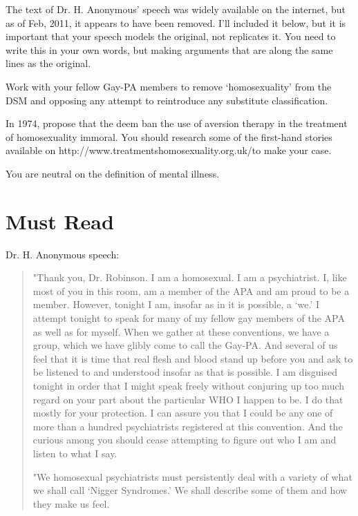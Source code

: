 \begin{refsection}
The text of Dr. H. Anonymous' speech was widely available on the internet, but as of Feb, 2011, it appears to have been removed. I'll included it below, but it is important that your speech models the original, not replicates it. You need to write this in your own words, but making arguments that are along the same lines as the original.

Work with your fellow Gay-PA members to remove `homosexuality' from the DSM and opposing any attempt to reintroduce any substitute classification.

In 1974, propose that the deem ban the use of aversion therapy in the treatment of homosexuality immoral. You should research some of the first-hand stories available on http:\slash \slash www.treatmentshomosexuality.org.uk\slash  to make your case.

You are neutral on the definition of mental illness. 

\section{Must Read}
\label{mustread}

Dr. H. Anonymous speech:

\begin{quote}

"Thank you, Dr. Robinson. I am a homosexual. I am a psychiatrist. I, like most of you in this room, am a member of the APA and am proud to be a member. However, tonight I am, insofar as in it is possible, a `we.' I attempt tonight to speak for many of my fellow gay members of the APA as well as for myself. When we gather at these conventions, we have a group, which we have glibly come to call the Gay-PA. And several of us feel that it is time that real flesh and blood stand up before you and ask to be listened to and understood insofar as that is possible. I am disguised tonight in order that I might speak freely without conjuring up too much regard on your part about the particular WHO I happen to be. I do that mostly for your protection. I can assure you that I could be any one of more than a hundred psychiatrists registered at this convention. And the curious among you should cease attempting to figure out who I am and listen to what I say.

"We homosexual psychiatrists must persistently deal with a variety of what we shall call `Nigger Syndromes.' We shall describe some of them and how they make us feel.


\end{quote}
\end{refsection}
